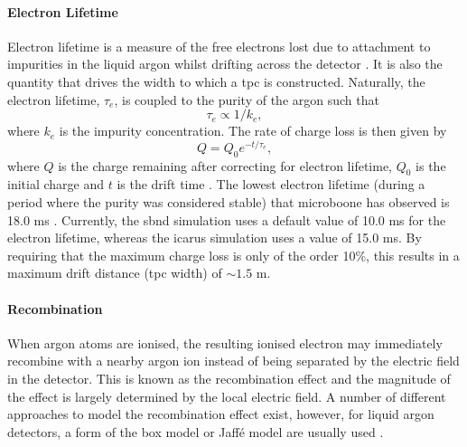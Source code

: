 \paragraph{Electron Lifetime}
 Electron lifetime is a measure of the free electrons lost due to attachment to impurities in the liquid argon whilst drifting across the detector \cite{ArgoNeuT_electron_lifetime_paper}. It is also the quantity that drives the width to which a \gls{tpc} is constructed. Naturally, the electron lifetime, $\tau_{e}$, is coupled to the purity of the argon such that
 \begin{equation}
     \tau_{e} \propto 1/k_e,
 \end{equation}
 where $k_e$ is the impurity concentration. The rate of charge loss is then given by 
 \begin{equation}
     Q = Q_{0}e^{-t/\tau_e},
 \end{equation}
where $Q$ is the charge remaining after correcting for electron lifetime, $Q_0$ is the initial charge and $t$ is the drift time \cite{ArgoNeuT_electron_lifetime_paper}. The lowest electron lifetime (during a period where the purity was considered stable) that \gls{microboone} has observed is 18.0 ms \cite{microboone_electron_lifetime}. Currently, the \gls{sbnd} simulation uses a default value of 10.0 ms for the electron lifetime, whereas the \gls{icarus} simulation uses a value of 15.0 ms. By requiring that the maximum charge loss is only of the order 10\%, this results in a maximum drift distance (\gls{tpc} width) of $\sim1.5$ m. 
 
\paragraph{Recombination}
When argon atoms are ionised, the resulting ionised electron may immediately recombine with a nearby argon ion instead of being separated by the electric field in the detector. This is known as the recombination effect and the magnitude of the effect is largely determined by the local electric field. A number of different approaches to model the recombination effect exist, however, for liquid argon detectors, a form of the box model or Jaff\'{e} model are usually used \cite{LArTPC_book}.

